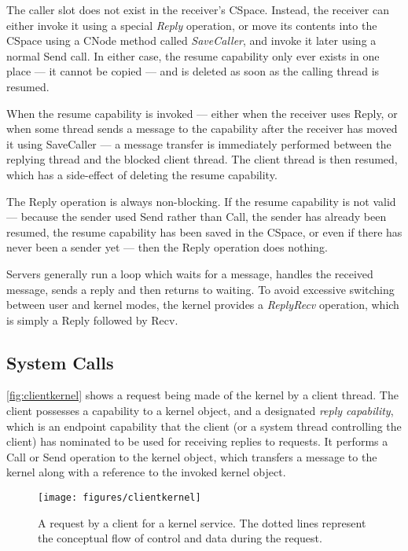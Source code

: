 The caller slot does not exist in the receiver's CSpace. Instead, the receiver can either invoke it using a special \emph{Reply} operation, or move its contents into the CSpace using a CNode method called \emph{SaveCaller}, and invoke it later using a normal Send call. In either case, the resume capability only ever exists in one place --- it cannot be copied --- and is deleted as soon as the calling thread is resumed.

When the resume capability is invoked --- either when the receiver uses Reply, or when some thread sends a message to the capability after the receiver has moved it using SaveCaller --- a message transfer is immediately performed between the replying thread and the blocked client thread. The client thread is then resumed, which has a side-effect of deleting the resume capability.

The Reply operation is always non-blocking. If the resume capability is not valid --- because the sender used Send rather than Call, the sender has already been resumed, the resume capability has been saved in the CSpace, or even if there has never been a sender yet --- then the Reply operation does nothing.

Servers generally run a loop which waits for a message, handles the received message, sends a reply and then returns to waiting. To avoid excessive switching between user and kernel modes, the kernel provides a \emph{ReplyRecv} operation, which is simply a Reply followed by Recv.

\subsection{System Calls}

\autoref{fig:clientkernel} shows a request being made of the kernel by a
client thread. The client possesses a capability to a kernel object, and a
designated \emph{reply capability}, which is an endpoint capability that the
client (or a system thread controlling the client) has nominated to be used
for receiving replies to requests. It performs a Call or Send operation to the kernel
object, which transfers a message to the kernel along with a reference to the
invoked kernel object.

\begin{figure}
\centering \texttt{[image: figures/clientkernel]}
\caption{A request by a client for a kernel service. The dotted lines
represent the conceptual flow of control and data during the
request.}
\label{fig:clientkernel}
\end{figure}

